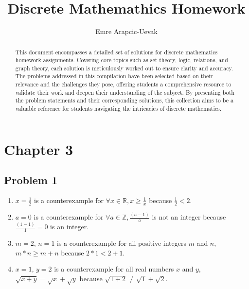 \documentclass[a4paper, 10pt]{article}
\title{Discrete Mathemathics Homework}
\author{Emre Arapcic-Uevak}
\date{}
\begin{document}
    \maketitle
    \vspace{5mm}

    \begin{abstract}
        \begin{center}
            \noindent This document encompasses a detailed set of solutions for discrete mathematics homework assignments. Covering core topics such as set theory, logic, relations, and graph theory, each solution is meticulously worked out to ensure clarity and accuracy. The problems addressed in this compilation have been selected based on their relevance and the challenges they pose, offering students a comprehensive resource to validate their work and deepen their understanding of the subject. By presenting both the problem statements and their corresponding solutions, this collection aims to be a valuable reference for students navigating the intricacies of discrete mathematics.
        \end{center}
    \end{abstract}
    \pagebreak

    \tableofcontents
    \pagebreak


    \section{Chapter 3}

    \subsection{Problem 1}
    \begin{enumerate}
        \item \( x = \frac{1}{2} \) is a counterexample for \( \forall x \in \mathbb{R}, x \geq \frac{1}{x} \) because \( \frac{1}{2} < 2 \).
        \item \( a = 0 \) is a counterexample for \( \forall a \in \mathbb{Z}, \frac{(a - 1)}{a} \) is not an integer because \( \frac{(1 - 1)}{1} = 0 \) is an integer.
        \item \( m = 2 \), \( n = 1 \) is a counterexample for all positive integers \( m \) and \( n \), \( m * n \geq m + n \) because \( 2 * 1 < 2 + 1 \).
        \item \( x = 1 \), \( y = 2 \) is a counterexample for all real numbers \( x \) and \( y \), \( \sqrt{x + y} = \sqrt{x} + \sqrt{y} \) because \( \sqrt{1 + 2} \neq \sqrt{1} + \sqrt{2} \).
    \end{enumerate}
\end{document}
